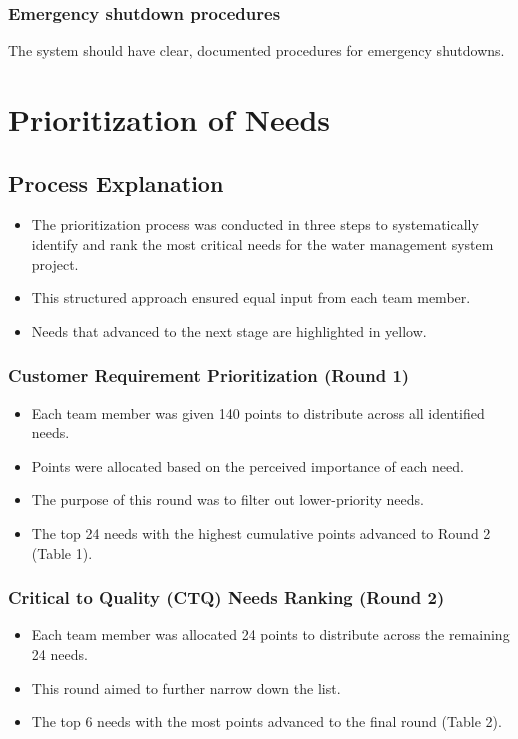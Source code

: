 \documentclass[11pt]{article}
\begin{document}
\subsubsection{Emergency shutdown procedures}
The system should have clear, documented procedures for emergency shutdowns.

\newpage
\section{Prioritization of Needs}

\subsection{Process Explanation}
\begin{itemize}
    \item The prioritization process was conducted in three steps to systematically identify and rank the most critical needs for the water management system project.
    \item This structured approach ensured equal input from each team member.
    \item Needs that advanced to the next stage are highlighted in yellow.
\end{itemize}

\subsubsection{Customer Requirement Prioritization (Round 1)}
\begin{itemize}
    \item Each team member was given 140 points to distribute across all identified needs.
    \item Points were allocated based on the perceived importance of each need.
    \item The purpose of this round was to filter out lower-priority needs.
    \item The top 24 needs with the highest cumulative points advanced to Round 2 (Table 1).
\end{itemize}

\subsubsection{Critical to Quality (CTQ) Needs Ranking (Round 2)}
\begin{itemize}
    \item Each team member was allocated 24 points to distribute across the remaining 24 needs.
    \item This round aimed to further narrow down the list.
    \item The top 6 needs with the most points advanced to the final round (Table 2).
\end{itemize}
\end{document}
